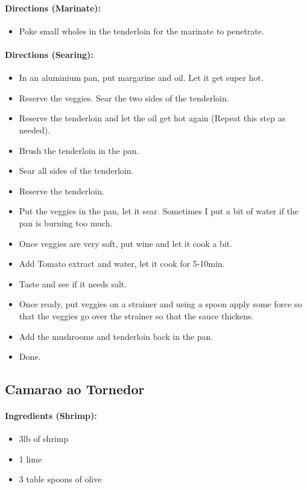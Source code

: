 \documentclass{article}
\begin{document}
\paragraph{Directions (Marinate):}
\begin{itemize}
    \item Poke small wholes in the tenderloin for the marinate to penetrate.
\end{itemize}  

\paragraph{Directions (Searing):}
\begin{itemize}
    \item In an aluminium pan, put margarine and oil. Let it get super hot.
    \item Reserve the veggies. Sear the two sides of the tenderloin.
    \item Reserve the tenderloin and let the oil get hot again (Repeat this step as needed).
    \item Brush the tenderloin in the pan.
    \item Sear all sides of the tenderloin.
    \item Reserve the tenderloin.
    \item Put the veggies in the pan, let it sear. Sometimes I put a bit of water if the pan is burning too much.
    \item Once veggies are very soft, put wine and let it cook a bit.
    \item Add Tomato extract and water, let it cook for 5-10min.
    \item Taste and see if it needs salt.
    \item Once ready, put veggies on a strainer and using a spoon apply some force so that the veggies go over the strainer so that the sauce thickens.
    \item Add the mushrooms and tenderloin back in the pan.
    \item Done.
\end{itemize} 

\subsection{Camarao ao Tornedor} 

\paragraph{Ingredients (Shrimp):}
\begin{itemize}
    \item 3lb of shrimp
    \item 1 lime
    \item 3 table spoons of olive
\end{itemize}  
\end{document}
